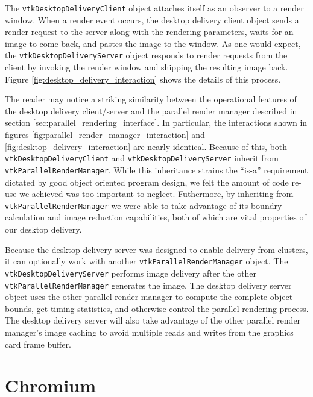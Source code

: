 \documentclass[twocolumn]{article}
\newcommand{\cidentifier}[1]{\texttt{#1}}
\begin{document}
  The \cidentifier{vtk\-Desktop\-Delivery\-Client} object attaches itself
  as an observer to a render window.  When a render event occurs, the
  desktop delivery client object sends a render request to the server along
  with the rendering parameters, waits for an image to come back, and
  pastes the image to the window.  As one would expect, the
  \cidentifier{vtk\-Desktop\-Delivery\-Server} object responds to render
  requests from the client by invoking the render window and shipping the
  resulting image back.  Figure \vref{fig:desktop_delivery_interaction}
  shows the details of this process.

  The reader may notice a striking similarity between the operational
  features of the desktop delivery client/server and the parallel render
  manager described in section \ref{sec:parallel_rendering_interface}.  In
  particular, the interactions shown in figures
  \ref{fig:parallel_render_manager_interaction} and
  \ref{fig:desktop_delivery_interaction} are nearly identical.  Because of
  this, both \cidentifier{vtk\-Desktop\-Delivery\-Client} and
  \cidentifier{vtk\-Desktop\-Delivery\-Server} inherit from
  \cidentifier{vtk\-Parallel\-Render\-Manager}.  While this inheritance
  strains the ``is-a'' requirement dictated by good object oriented program
  design, we felt the amount of code re-use we achieved was too important
  to neglect.  Futhermore, by inheriting from
  \cidentifier{vtk\-Parallel\-Render\-Manager} we were able to take
  advantage of its boundry calculation and image reduction capabilities,
  both of which are vital properties of our desktop delivery.

  Because the desktop delivery server was designed to enable delivery from
  clusters, it can optionally work with another
  \cidentifier{vtk\-Parallel\-Render\-Manager} object.  The
  \cidentifier{vtk\-Desktop\-Delivery\-Server} performs image delivery
  after the other \cidentifier{vtk\-Parallel\-Render\-Manager} generates
  the image.  The desktop delivery server object uses the other parallel
  render manager to compute the complete object bounds, get timing
  statistics, and otherwise control the parallel rendering process.  The
  desktop delivery server will also take advantage of the other parallel
  render manager's image caching to avoid multiple reads and writes from
  the graphics card frame buffer.


  \section{Chromium}
  \label{sec:chromium}
\end{document}

